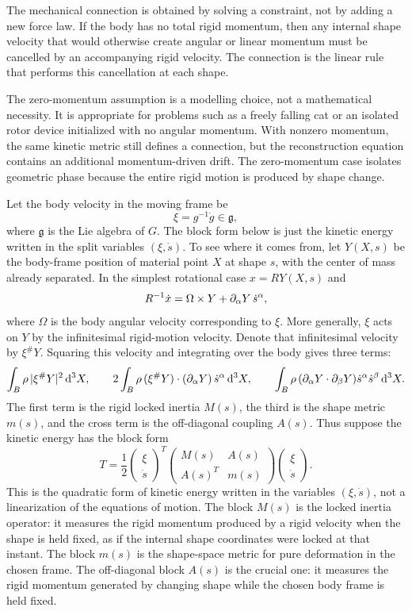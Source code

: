 The mechanical connection is obtained by solving a constraint, not by adding a
new force law. If the body has no total rigid momentum, then any internal shape
velocity that would otherwise create angular or linear momentum must be
cancelled by an accompanying rigid velocity. The connection is the linear rule
that performs this cancellation at each shape.

The zero-momentum assumption is a modelling choice, not a mathematical
necessity. It is appropriate for problems such as a freely falling cat or an
isolated rotor device initialized with no angular momentum. With nonzero
momentum, the same kinetic metric still defines a connection, but the
reconstruction equation contains an additional momentum-driven drift. The
zero-momentum case isolates geometric phase because the
entire rigid motion is produced by shape change.

Let the body velocity in the moving frame be
\[
  \xi=g^{-1}\dot g\in\mathfrak g,
\]
where \(\mathfrak g\) is the Lie algebra of \(G\). The block form below is just
the kinetic energy written in the split variables \((\xi,\dot s)\).  To see
where it comes from, let \(Y(X,s)\) be the body-frame position of material point
\(X\) at shape \(s\), with the center of mass already separated.  In the
simplest rotational case \(x=RY(X,s)\) and
\[
  R^{-1}\dot x=\Omega\times Y+\partial_\alpha Y\,\dot s^\alpha ,
\]
where \(\Omega\) is the body angular velocity corresponding to \(\xi\).  More
generally, \(\xi\) acts on \(Y\) by the infinitesimal rigid-motion velocity.
Denote that infinitesimal velocity by \(\xi^\#Y\).  Squaring this velocity and
integrating over the body gives three terms:
\[
  \int_B\rho\,|\xi^\#Y|^2\,\mathrm{d}^3X,\qquad
  2\int_B\rho\,(\xi^\#Y)\cdot(\partial_\alpha Y)\,\dot s^\alpha\,\mathrm{d}^3X,\qquad
  \int_B\rho\,(\partial_\alpha Y\cdot\partial_\beta Y)
    \dot s^\alpha\dot s^\beta\,\mathrm{d}^3X .
\]
The first term is the rigid locked inertia \(M(s)\), the third is the shape
metric \(m(s)\), and the cross term is the off-diagonal coupling \(A(s)\).
Thus suppose the kinetic energy has the block form
\[
  T
  =
  \frac12
  \begin{pmatrix}
  \xi\\ \dot s
  \end{pmatrix}^T
  \begin{pmatrix}
  M(s) & A(s)\\
  A(s)^T & m(s)
  \end{pmatrix}
  \begin{pmatrix}
  \xi\\ \dot s
  \end{pmatrix}.
\]
This is the quadratic form of kinetic energy written in the variables
\((\xi,\dot s)\), not a linearization of the equations of motion. The block
\(M(s)\) is the locked inertia operator:
it measures the rigid momentum produced by a rigid velocity when the shape is
held fixed, as if the internal shape coordinates were locked at that instant.
The block \(m(s)\) is the shape-space metric for pure deformation
in the chosen frame.  The off-diagonal block \(A(s)\) is the crucial one: it
measures the rigid momentum generated by changing shape while the chosen body
frame is held fixed.

